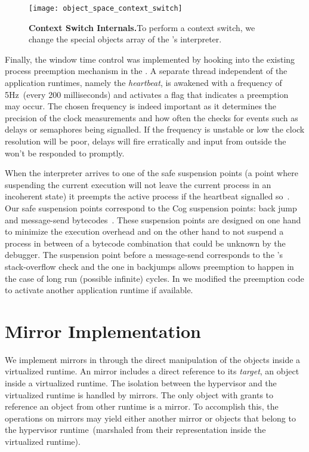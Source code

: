 \begin{figure}[ht]
\begin{center}
\texttt{[image: object\_space\_context\_switch]}
\caption{\textbf{Context Switch Internals.}To perform a context switch, we change the special objects array of the \VM's interpreter.\label{fig:context_switch}}
\end{center}
\end{figure}

Finally, the window time control was implemented by hooking into the existing process preemption mechanism in the \VM. A separate \VM thread independent of the application runtimes, namely the \emph{heartbeat}, is awakened with a frequency of 5Hz~(\ie every 200 milliseconds) and activates a flag that indicates a preemption may occur. The chosen frequency is indeed important as it determines the precision of the clock measurements and how often the \VM checks for events such as delays or semaphores being signalled. If the frequency is unstable or low the clock resolution will be poor, delays will fire erratically and input from outside the \VM won't be responded to promptly.

When the \VM interpreter arrives to one of the safe suspension points (\ie a point where suspending the current execution will not leave the current process in an incoherent state) it preempts the active process if the heartbeat signalled so~\cite{Deut84a}. Our safe suspension points correspond to the Cog \VM suspension points: back jump and message-send bytecodes~\cite{Mira11a}. These suspension points are designed on one hand to minimize the execution overhead and on the other hand to not suspend a process in between of a bytecode combination that could be unknown by the debugger. The suspension point before a message-send corresponds to the \VM's stack-overflow check and the one in backjumps allows preemption to happen in the case of long run (possible infinite) cycles. In \Vtt we modified the preemption code to activate another application runtime if available.

\section{\Vtt Mirror Implementation}\label{sec:implementation_mirrors}

We implement mirrors in \Vtt through the direct manipulation of the objects inside a virtualized runtime. An \Vtt mirror includes a direct reference to its \emph{target}, an object inside a virtualized runtime. The isolation between the hypervisor and the virtualized runtime is handled by mirrors. The only object with grants to reference an object from other runtime is a mirror. To accomplish this, the operations on mirrors may yield either another mirror or objects that belong to the hypervisor runtime~(marshaled from their representation inside the virtualized runtime).

